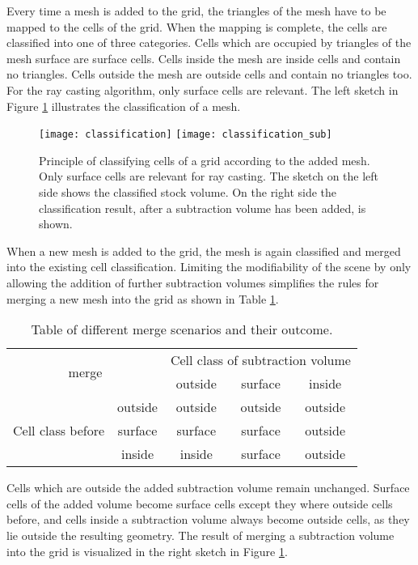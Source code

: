 Every time a mesh is added to the grid, the triangles of the mesh have to be mapped to the cells of the grid. When the mapping is complete, the cells are classified into one of three categories. Cells which are occupied by triangles of the mesh surface are surface cells. Cells inside the mesh are inside cells and contain no triangles. Cells outside the mesh are outside cells and contain no triangles too. For the ray casting algorithm, only surface cells are relevant. The left sketch in Figure \ref{fig:classification} illustrates the classification of a mesh.

\begin{figure}[h]
\centering
\texttt{[image: classification]}
\texttt{[image: classification\_sub]}
\caption[Principle of classifying cells of a grid according to the added mesh.]{Principle of classifying cells of a grid according to the added mesh. Only surface cells are relevant for ray casting. The sketch on the left side shows the classified stock volume. On the right side the classification result, after a subtraction volume has been added, is shown.}
\label{fig:classification}
\end{figure}

When a new mesh is added to the grid, the mesh is again classified and merged into the existing cell classification. Limiting the modifiability of the scene by only allowing the addition of further subtraction volumes simplifies the rules for merging a new mesh into the grid as shown in Table \ref{tbl:classification_rules}.

\begin{table}[h]
\centering
\begin{tabular}{|c|c|c|c|c|}
\hline
\multicolumn{2}{|c|}{\multirow{2}{*}{merge}} & \multicolumn{3}{c|}{Cell class of subtraction volume} \\
\cline{3-5}
\multicolumn{2}{|c|}{} & outside & surface & inside \\
 \hline
\multirow{3}{*}{Cell class before} & outside & outside & outside & outside \\
\cline{2-5}
 & surface & surface & surface & outside \\
\cline{2-5}
 & inside & inside & surface & outside \\
\hline
\end{tabular}
\caption{Table of different merge scenarios and their outcome.}
\label{tbl:classification_rules}
\end{table}

Cells which are outside the added subtraction volume remain unchanged. Surface cells of the added volume become surface cells except they where outside cells before, and cells inside a subtraction volume always become outside cells, as they lie outside the resulting geometry. The result of merging a subtraction volume into the grid is visualized in the right sketch in Figure \ref{fig:classification}.

